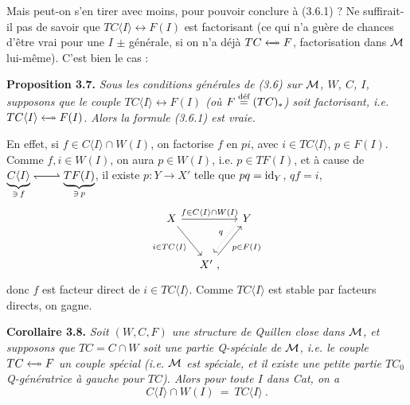 Mais peut-on s'en tirer avec moins, pour pouvoir conclure à (3.6.1) ? Ne suffirait-il pas de savoir que $TC\langle I\rangle\longleftrightarrow F(I)$ est factorisant (ce qui n'a guère de chances d'être vrai pour une $I$ $\pm$ générale, si on n'a déjà $TC\fact F$, factorisation dans $\M$ lui-même). C'est bien le cas :

\textbf{Proposition 3.7.} \textit{Sous les conditions générales de \textup{(3.6)} sur $\M$, $W$, $C$, $I$, supposons que le couple $TC\langle I\rangle\longleftrightarrow F(I)$ (où $F\deq (TC)_*$) soit factorisant, i.e. $TC\langle I\rangle\fact F(I)$. Alors la formule \textup{(3.6.1)} est vraie.}

En effet, si $f\in C\langle I\rangle\cap W(I)$, on factorise $f$ en $pi$, avec $i\in TC\langle I\rangle$, $p\in F(I)$. Comme $f,i\in W(I)$, on aura $p\in W(I)$, i.e. $p\in TF(I)$, et à cause de $\underbrace{C\langle I\rangle}_{\ni\, f}\harp\underbrace{TF(I)}_{\ni\, p}$, il existe $p : Y\longrightarrow X'$ telle que $pq=\id_Y$, $qf=i$, %
\[
\begin{tikzcd}[column sep=small, row sep=large]
X \arrow[rr, "f\in C\langle I\rangle\cap W(I)"] \arrow[dr, "i\in TC\langle I\rangle"'] & & Y \arrow[dl, dotted, shift right=1ex, "q"'] \\
& X' \arrow[ur, "p\in F(I)"'] \ , &
\end{tikzcd}
\]
donc $f$ est facteur direct de $i\in TC\langle I\rangle$. Comme $TC\langle I\rangle$ est stable par facteurs directs, on gagne.

\textbf{Corollaire 3.8.} \textit{Soit $(W,C,F)$ une structure de Quillen close dans $\M$, et supposons que $TC=C\cap W$ soit une partie Q-spéciale de $\M$, i.e. le couple $TC\fact F$ un couple spécial (i.e. $\M$ est \textup{spéciale}, et il existe une petite partie $TC_0$ Q-génératrice à gauche pour $TC$). Alors pour toute $I$ dans \textup{Cat}, on a}
\[
C\langle I\rangle\cap W(I) \ = \ TC\langle I\rangle \ . \tag*{(3.8.1)}
\]


